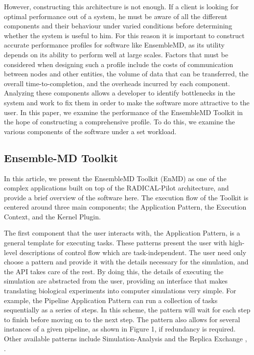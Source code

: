 \documentclass[]{article}
\begin{document}
		However, constructing this architecture is not enough. If a client is looking for optimal performance out of a system, he must be aware of all the different components and their behaviour under varied conditions before determining whether the system is useful to him. For this reason it is important to construct accurate performance profiles for software like EnsembleMD, as its utility depends on its ability to perform well at large scales. Factors that must be considered when designing such a profile include the costs of communication between nodes and other entities, the volume of data that can be transferred, the overall time-to-completion, and the overheads incurred by each component. Analyzing these components allows a developer to identify bottlenecks in the system and work to fix them in order to make the software more attractive to the user. In this paper, we examine the performance of the EnsembleMD Toolkit in the hope of constructing a comprehensive profile. To do this, we examine the various components of the software under a set workload.

	\subsection{Ensemble-MD Toolkit} 
		In this article, we present the EnsembleMD Toolkit (EnMD) as one of the complex applications built on top of the RADICAL-Pilot architecture, and provide a brief overview of the software here. The execution flow of the Toolkit is centered around three main components; the Application Pattern, the Execution Context, and the Kernel Plugin. 


		The first component that the user interacts with, the Application Pattern, is a general template for executing tasks. These patterns present the user with high-level descriptions of control flow which are task-independent. The user need only choose a pattern and provide it with the details necessary for the simulation, and the API takes care of the rest. By doing this, the details of executing the simulation are abstracted from the user, providing an interface that makes translating biological experiments into computer simulations very simple. For example, the Pipeline Application Pattern can run a collection of tasks sequentially as a series of steps. In this scheme, the pattern will wait for each step to finish before moving on to the next step. The pattern also allows for several instances of a given pipeline, as shown in Figure 1, if redundancy is required. Other available patterns include Simulation-Analysis and the Replica Exchange \cite{enmd_paper}, \cite{repex_paper}.
\end{document}
